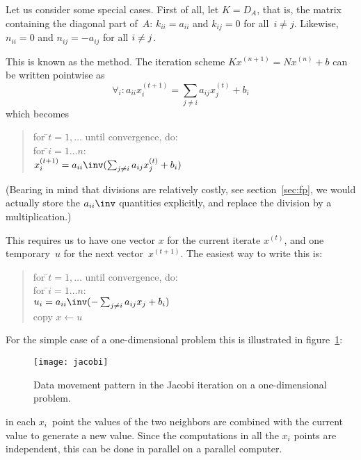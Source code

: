 Let us consider some special cases. First of all, let $K=D_A$, that
is, the matrix containing the diagonal part of~$A$: $k_{ii}=a_{ii}$
and $k_{ij}=0$ for all~\mbox{$i\not=j$}. 
Likewise, $n_{ii}=0$ and $n_{ij}=-a_{ij}$ for all $i\not=\nobreak j$.

This is known as the
 method. The iteration scheme
$Kx^{(n+1)}=Nx^{(n)}+b$ can be written pointwise as
\[ \forall_i\colon
    a_{ii}x^{(t+1)}_i = \sum_{j\not=i} a_{ij}x^{(t)}_j+b_i
\]
which becomes
\begin{quote}
  \begin{tabbing}
    for \=$t=1,\ldots$ until convergence, do:\\
    \>for \=$i=1\ldots n$:\\
    \>\>$x^{(t+1)}_i = a_{ii}\inv(\sum_{j\not=i} a_{ij}x^{(t)}_j+b_i)$
  \end{tabbing}
\end{quote}
(Bearing in mind that divisions are relatively costly,
see section~\ref{sec:fp}, we would actually store the $a_{ii}\inv$
quantities explicitly, and replace the division by a multiplication.)

This requires us to have one vector $x$ for the current iterate
$x^{(t)}$, and one temporary~$u$ for the next vector~$x^{(t+1)}$. The
easiest way to write this is:
\begin{quote}
  \begin{tabbing}
    for \=$t=1,\ldots$ until convergence, do:\\
    \>for \=$i=1\ldots n$:\\
    \>\>$u_i = a_{ii}\inv (-\sum_{j\not=i} a_{ij}x_j+b_i)$\\
    \>copy $x\leftarrow u$
  \end{tabbing}
\end{quote}
For the simple case of a one-dimensional problem this is illustrated
in figure~\ref{fig:1d-jacobi}:
\begin{figure}[ht]
  \texttt{[image: jacobi]}
  \caption{Data movement pattern in the Jacobi iteration on a
    one-dimensional problem.}
  \label{fig:1d-jacobi}
\end{figure}
in each $x_i$~point the values of the two neighbors are combined with
the current value to generate a new value. Since the computations in
all the $x_i$ points are independent, this can be done
in parallel on a parallel computer.

